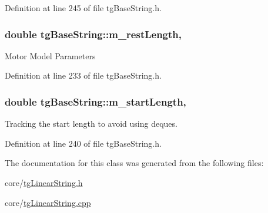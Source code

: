 Definition at line 245 of file tg\-Base\-String.\-h.

\hypertarget{classtg_base_string_a7e5cf579c266faed950ee215bf1bc596}{
\subsubsection[{m\-\_\-rest\-Length}]{\setlength{\rightskip}{0pt plus 5cm}double tg\-Base\-String\-::m\-\_\-rest\-Length\hspace{0.3cm}{\ttfamily [protected]}, {\ttfamily [inherited]}}}\label{classtg_base_string_a7e5cf579c266faed950ee215bf1bc596}
Motor Model Parameters 

Definition at line 233 of file tg\-Base\-String.\-h.

\hypertarget{classtg_base_string_a14e96c33278197f084ee733b93123b0e}{
\subsubsection[{m\-\_\-start\-Length}]{\setlength{\rightskip}{0pt plus 5cm}double tg\-Base\-String\-::m\-\_\-start\-Length\hspace{0.3cm}{\ttfamily [protected]}, {\ttfamily [inherited]}}}\label{classtg_base_string_a14e96c33278197f084ee733b93123b0e}
Tracking the start length to avoid using deques. 

Definition at line 240 of file tg\-Base\-String.\-h.



The documentation for this class was generated from the following files\-:\begin{DoxyCompactItemize}
\item 
core/\hyperlink{tg_linear_string_8h}{tg\-Linear\-String.\-h}\item 
core/\hyperlink{tg_linear_string_8cpp}{tg\-Linear\-String.\-cpp}\end{DoxyCompactItemize}
